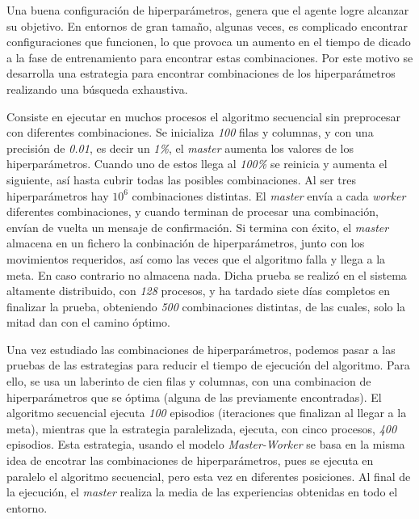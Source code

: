 		
		
		
		Una buena configuración de hiperparámetros, genera que el agente logre alcanzar su objetivo. En entornos de gran tamaño, algunas veces, es complicado encontrar configuraciones que funcionen, lo que provoca un aumento en el tiempo de dicado a la fase de entrenamiento para encontrar estas combinaciones. Por este motivo se desarrolla una estrategia para encontrar combinaciones de los hiperparámetros realizando una búsqueda exhaustiva. 
		
		Consiste en ejecutar en muchos procesos el algoritmo secuencial sin preprocesar con diferentes combinaciones. Se inicializa \textit{100} filas y columnas, y con una precisión de \textit{0.01}, es decir un \textit{1\%}, el \textit{master} aumenta los valores de los hiperparámetros. Cuando uno de estos llega al \textit{100\%} se reinicia y aumenta el siguiente, así hasta cubrir todas las posibles combinaciones. Al ser tres hiperparámetros hay \(10^{6}\) combinaciones distintas. El \textit{master} envía a cada \textit{worker} diferentes combinaciones, y cuando terminan de procesar una combinación, envían de vuelta un mensaje de confirmación. Si termina con éxito, el \textit{master} almacena en un fichero la conbinación de hiperparámetros, junto con los movimientos requeridos, así como las veces que el algoritmo falla y llega a la meta. En caso contrario no almacena nada. Dicha prueba se realizó en el sistema altamente distribuido, con \textit{128} procesos, y ha tardado siete días completos en finalizar la prueba, obteniendo \textit{500} combinaciones distintas, de las cuales, solo la mitad dan con el camino óptimo.
		


		
	
	
		Una vez estudiado las combinaciones de hiperparámetros, podemos pasar a las pruebas de las estrategias para reducir el tiempo de ejecución del algoritmo. Para ello, se usa un laberinto de cien filas y columnas, con una combinacion de hiperparámetros que se óptima (alguna de las previamente encontradas). El algoritmo secuencial ejecuta \textit{100} episodios (iteraciones que finalizan al llegar a la meta), mientras que la estrategia paralelizada, ejecuta, con cinco procesos, \textit{400} episodios. Esta estrategia, usando el modelo \textit{Master-Worker} se basa en la misma idea de encotrar las combinaciones de hiperparámetros, pues se ejecuta en paralelo el algoritmo secuencial, pero esta vez en diferentes posiciones. Al final de la ejecución, el \textit{master} realiza la media de las experiencias obtenidas en todo el entorno. 
		
